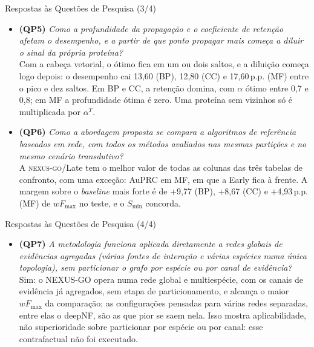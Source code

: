 \documentclass[aspectratio=169,11pt]{beamer}
\newcommand{\wF}{wF_{\max}}
\newcommand{\Smin}{S_{\min}}
\newcommand{\NX}[1]{\textsc{nexus-go}/#1}
\begin{document}
\begin{frame}{Respostas às Questões de Pesquisa (3/4)}
  \begin{itemize}\setlength{\itemsep}{0.9em}\small
    \item<+-> \textbf{(QP5)} {\scriptsize\textit{Como a profundidade da propagação e o coeficiente de retenção afetam o desempenho, e a partir de que ponto propagar mais começa a diluir o sinal da própria proteína?}}\\[0.2em]
      Com a cabeça vetorial, o ótimo fica em um ou dois saltos, e a diluição começa logo depois: o desempenho cai 13,60 (BP), 12,80 (CC) e 17,60\,p.p. (MF) entre o pico e dez saltos. Em BP e CC, a retenção domina, com $\alpha$ ótimo entre 0,7 e 0,8; em MF a profundidade ótima é zero. Uma proteína sem vizinhos só é multiplicada por $\alpha^{T}$.
    \item<+-> \textbf{(QP6)} {\scriptsize\textit{Como a abordagem proposta se compara a algoritmos de referência baseados em rede, com todos os métodos avaliados nas mesmas partições e no mesmo cenário transdutivo?}}\\[0.2em]
      A \NX{Late} tem o melhor valor de todas as colunas das três tabelas de confronto, com uma exceção: AuPRC em MF, em que a Early fica à frente. A margem sobre o \textit{baseline} mais forte é de +9,77 (BP), +8,67 (CC) e +4,93\,p.p. (MF) de $\wF$ no teste, e o $\Smin$ concorda.
  \end{itemize}
\end{frame}

\begin{frame}{Respostas às Questões de Pesquisa (4/4)}
  \begin{itemize}\setlength{\itemsep}{0.9em}\small
    \item<+-> \textbf{(QP7)} {\scriptsize\textit{A metodologia funciona aplicada diretamente a redes globais de evidências agregadas (várias fontes de interação e várias espécies numa única topologia), sem particionar o grafo por espécie ou por canal de evidência?}}\\[0.2em]
      Sim: o NEXUS-GO opera numa rede global e multiespécie, com os canais de evidência já agregados, sem etapa de particionamento, e alcança o maior $\wF$ da comparação; as configurações pensadas para várias redes separadas, entre elas o deepNF, são as que pior se saem nela. Isso mostra aplicabilidade, não superioridade sobre particionar por espécie ou por canal: esse contrafactual não foi executado.
  \end{itemize}
\end{frame}
\end{document}
